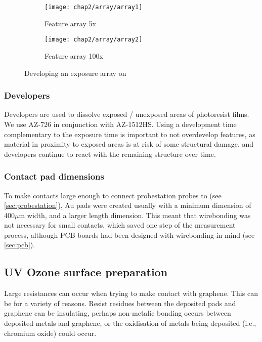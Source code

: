 \documentclass[../../Matt_Gebert_Honours_Thesis.tex]{subfiles}
\begin{document}
	\begin{figure}[H]
		\centering
		\begin{subfigure}{0.45\textwidth}
			\texttt{[image: chap2/array/array1]}
			\caption{Feature array 5x}
		\end{subfigure}
		\begin{subfigure}{0.45\textwidth}
			\texttt{[image: chap2/array/array2]}
			\caption{Feature array 100x}
		\end{subfigure}
		\caption{Developing an exposure array on \silicondioxide}\label{fig:exposure_array}
	\end{figure}
	
	\subsubsection{Developers}\label{sec:developer}
	Developers are used to dissolve exposed / unexposed areas of photoresist films. We use AZ-726 in conjunction with AZ-1512HS. Using a development time complementary to the exposure time is important to not overdevelop features, as material in proximity to exposed areas is at risk of some structural damage, and developers continue to react with the remaining structure over time.
	
	\subsubsection{Contact pad dimensions}
	To make contacts large enough to connect probestation probes to (see \cref{sec:probestation}), Au pads were created usually with a minimum dimension of 400$\mu$m width, and a larger length dimension. This meant that wirebonding was not necessary for small contacts, which saved one step of the measurement process, although PCB boards had been designed with wirebonding in mind (see \cref{sec:pcb}).
	
	\subsection{UV Ozone surface preparation}\label{sec:uv_ozone}
	Large resistances can occur when trying to make contact with graphene. This can be for a variety of reasons. Resist residues between the deposited pads and graphene can be insulating, perhaps non-metalic bonding occurs between deposited metals and graphene, or the oxidisation of metals being deposited (i.e., chromium oxide) could occur.
	
\end{document}
